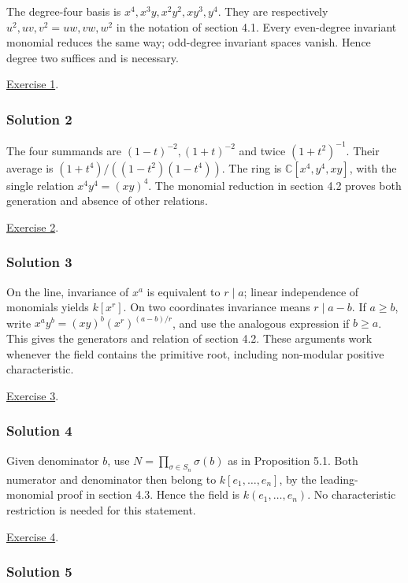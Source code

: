 \documentclass[
]{article}
\begin{document}
The degree-four basis is \(x^4,x^3y,x^2y^2,xy^3,y^4\). They are
respectively \(u^2,uv,v^2=uw,vw,w^2\) in the notation of section 4.1.
Every even-degree invariant monomial reduces the same way; odd-degree
invariant spaces vanish. Hence degree two suffices and is necessary.

\hyperref[exercise-1]{Exercise 1}.

\subsubsection{Solution 2}\label{solution-2}

The four summands are \((1-t)^{-2},(1+t)^{-2}\) and twice
\((1+t^2)^{-1}\). Their average is \((1+t^4)/((1-t^2)(1-t^4))\). The
ring is \(\mathbb C [x^4,y^4,xy]\), with the single relation
\(x^4y^4=(xy)^4\). The monomial reduction in section 4.2 proves both
generation and absence of other relations.

\hyperref[exercise-2]{Exercise 2}.

\subsubsection{Solution 3}\label{solution-3}

On the line, invariance of \(x^a\) is equivalent to \(r\mid a\); linear
independence of monomials yields \(k [x^r]\). On two coordinates
invariance means \(r\mid a-b\). If \(a\geq b\), write
\(x^ay^b=(xy)^b(x^r)^{(a-b)/r}\), and use the analogous expression if
\(b\geq a\). This gives the generators and relation of section 4.2.
These arguments work whenever the field contains the primitive root,
including non-modular positive characteristic.

\hyperref[exercise-3]{Exercise 3}.

\subsubsection{Solution 4}\label{solution-4}

Given denominator \(b\), use \(N=\prod_{\sigma\in S_n}\sigma(b)\) as in
Proposition 5.1. Both numerator and denominator then belong to
\(k [e_1,\ldots,e_n]\), by the leading-monomial proof in section 4.3.
Hence the field is \(k(e_1,\ldots,e_n)\). No characteristic restriction
is needed for this statement.

\hyperref[exercise-4]{Exercise 4}.

\subsubsection{Solution 5}\label{solution-5}
\end{document}
